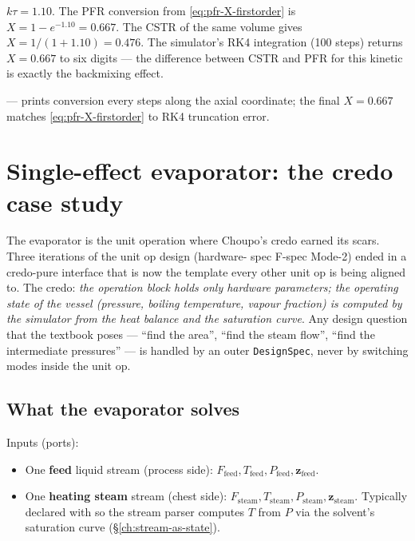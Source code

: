 \documentclass[11pt,a4paper]{article}
\newcommand{\zv}{\mathbf{z}}
\begin{document}
\begin{example}
$k\tau = 1.10$. The PFR conversion from
\eqref{eq:pfr-X-firstorder} is $X = 1 - e^{-1.10} = 0.667$. The CSTR
of the same volume gives $X = 1/(1 + 1.10) = 0.476$. The simulator's
RK4 integration (100 steps) returns $X = 0.667$ to six digits ---
the difference between CSTR and PFR for this kinetic is exactly the
backmixing effect.
\end{example}

\begin{tutoriallink}
 --- prints conversion every
 steps along the axial coordinate; the final
$X = 0.667$ matches \eqref{eq:pfr-X-firstorder} to RK4 truncation
error.
\end{tutoriallink}

\section{Single-effect evaporator: the credo case study}\label{ch:evap-mode2}

\begin{whatyoulllearn}
The evaporator is the unit operation where Choupo's credo earned
its scars.  Three iterations of the unit op design (hardware-
spec F-spec Mode-2) ended in a credo-pure interface
that is now the template every other unit op is being aligned to.
The credo: \emph{the operation block holds only hardware
parameters; the operating state of the vessel (pressure, boiling
temperature, vapour fraction) is computed by the simulator from
the heat balance and the saturation curve}.  Any design question
that the textbook poses --- ``find the area'', ``find the steam
flow'', ``find the intermediate pressures'' --- is handled by an
outer \texttt{DesignSpec}, never by switching modes inside the
unit op.
\end{whatyoulllearn}

\subsection{What the evaporator solves}

Inputs (ports):
\begin{itemize}[leftmargin=*,nosep,topsep=2pt]
  \item One \textbf{feed} liquid stream (process side):
        $F_{\!\text{feed}}, T_{\!\text{feed}}, P_{\!\text{feed}},
         \zv_{\!\text{feed}}$.
  \item One \textbf{heating steam} stream (chest side):
        $F_{\!\text{steam}}, T_{\!\text{steam}}, P_{\!\text{steam}},
         \zv_{\!\text{steam}}$.
        Typically declared with
         so the stream parser computes
        $T$ from $P$ via the solvent's saturation curve
        (\S\ref{ch:stream-as-state}).
\end{itemize}
\end{document}

